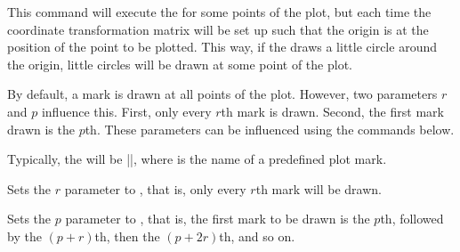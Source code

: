 \begin{command}{\pgfplothandlermark{}}
    This command will execute the  for some points of the plot,
    but each time the coordinate transformation matrix will be set up such that
    the origin is at the position of the point to be plotted. This way, if the
     draws a little circle around the origin, little circles
    will be drawn at some point of the plot.

    By default, a mark is drawn at all points of the plot. However, two
    parameters $r$ and $p$ influence this. First, only every $r$th mark is
    drawn. Second, the first mark drawn is the $p$th. These parameters can be
    influenced using the commands below.
\begin{codeexample}[]
\end{codeexample}

    Typically, the  will be ||, where  is the name of a predefined plot
    mark.
\end{command}

\begin{command}{\pgfsetplotmarkrepeat{}}
    Sets the $r$ parameter to , that is, only every $r$th mark
    will be drawn.
\end{command}

\begin{command}{\pgfsetplotmarkphase{}}
    Sets the $p$ parameter to , that is, the first mark to be drawn
    is the $p$th, followed by the $(p+r)$th, then the $(p+2r)$th, and so on.
\end{command}

